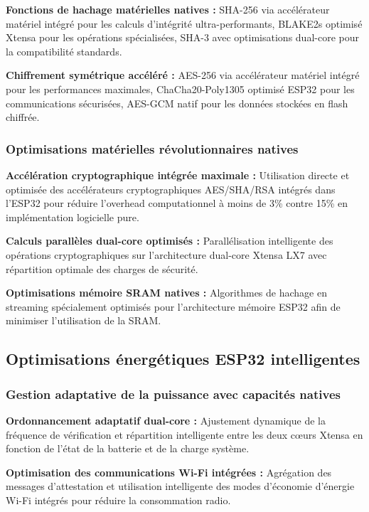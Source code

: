 \textbf{Fonctions de hachage matérielles natives :} SHA-256 via accélérateur matériel intégré pour les calculs d'intégrité ultra-performants, BLAKE2s optimisé Xtensa pour les opérations spécialisées, SHA-3 avec optimisations dual-core pour la compatibilité standards.

\textbf{Chiffrement symétrique accéléré :} AES-256 via accélérateur matériel intégré pour les performances maximales, ChaCha20-Poly1305 optimisé ESP32 pour les communications sécurisées, AES-GCM natif pour les données stockées en flash chiffrée.

\subsubsection{Optimisations matérielles révolutionnaires natives}

\textbf{Accélération cryptographique intégrée maximale :} Utilisation directe et optimisée des accélérateurs cryptographiques AES/SHA/RSA intégrés dans l'ESP32 pour réduire l'overhead computationnel à moins de 3\% contre 15\% en implémentation logicielle pure.

\textbf{Calculs parallèles dual-core optimisés :} Parallélisation intelligente des opérations cryptographiques sur l'architecture dual-core Xtensa LX7 avec répartition optimale des charges de sécurité.

\textbf{Optimisations mémoire SRAM natives :} Algorithmes de hachage en streaming spécialement optimisés pour l'architecture mémoire ESP32 afin de minimiser l'utilisation de la SRAM.

\subsection{Optimisations énergétiques ESP32 intelligentes}

\subsubsection{Gestion adaptative de la puissance avec capacités natives}

\textbf{Ordonnancement adaptatif dual-core :} Ajustement dynamique de la fréquence de vérification et répartition intelligente entre les deux cœurs Xtensa en fonction de l'état de la batterie et de la charge système.

\textbf{Optimisation des communications Wi-Fi intégrées :} Agrégation des messages d'attestation et utilisation intelligente des modes d'économie d'énergie Wi-Fi intégrés pour réduire la consommation radio.

